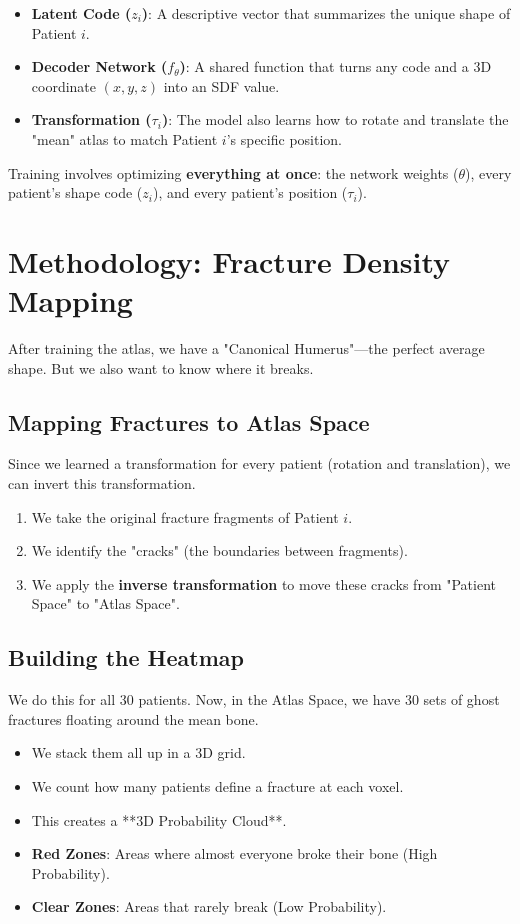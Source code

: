 \documentclass[12pt]{article}
\begin{document}
\begin{itemize}
    \item \textbf{Latent Code ($z_i$)}: A descriptive vector that summarizes the unique shape of Patient $i$.
    \item \textbf{Decoder Network ($f_\theta$)}: A shared function that turns any code and a 3D coordinate $(x,y,z)$ into an SDF value.
    \item \textbf{Transformation ($\tau_i$)}: The model also learns how to rotate and translate the "mean" atlas to match Patient $i$'s specific position.
\end{itemize}

Training involves optimizing \textbf{everything at once}: the network weights ($\theta$), every patient's shape code ($z_i$), and every patient's position ($\tau_i$).

\section{Methodology: Fracture Density Mapping}

After training the atlas, we have a "Canonical Humerus"—the perfect average shape. But we also want to know where it breaks.

\subsection{Mapping Fractures to Atlas Space}
Since we learned a transformation for every patient (rotation and translation), we can invert this transformation.

\begin{enumerate}
    \item We take the original fracture fragments of Patient $i$.
    \item We identify the "cracks" (the boundaries between fragments).
    \item We apply the \textbf{inverse transformation} to move these cracks from "Patient Space" to "Atlas Space".
\end{enumerate}

\subsection{Building the Heatmap}
We do this for all 30 patients. Now, in the Atlas Space, we have 30 sets of ghost fractures floating around the mean bone.
\begin{itemize}
    \item We stack them all up in a 3D grid.
    \item We count how many patients define a fracture at each voxel.
    \item This creates a **3D Probability Cloud**.
    \item \textbf{Red Zones}: Areas where almost everyone broke their bone (High Probability).
    \item \textbf{Clear Zones}: Areas that rarely break (Low Probability).
\end{itemize}
\end{document}
